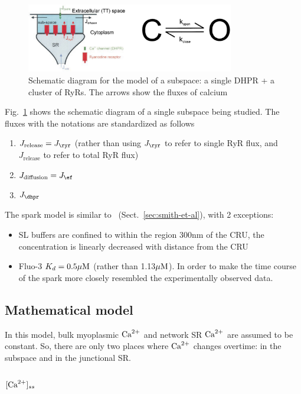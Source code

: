 \begin{figure}[hbt]
  \centerline{\includegraphics[height=3cm,
    angle=0]{./images/Sobie_Jafri-2002.eps}}
  \caption{Schematic diagram for the model of a subspace: a single DHPR
    + a cluster of RyRs. The arrows show the fluxes of calcium}
  \label{fig:Sobie_Jafri2002}
\end{figure}

Fig.~\ref{fig:Sobie_Jafri2002} shows the schematic diagram of a single
subspace being studied. The fluxes with the notations are standardized
as follows
\begin{enumerate}
\item $J_\text{release} = J_\ryr$ (rather than using $J_\ryr$ to refer
  to single RyR flux, and $J_\text{release}$ to refer to total RyR
  flux)
\item $J_\text{diffusion} = J_\ef$
\item $J_\dhpr$
\end{enumerate}

The spark model is similar to~\citep{smith1998}
(Sect.~\ref{sec:smith-et-al}), with 2 exceptions:
\begin{itemize}
\item SL buffers are confined to within the region 300nm of the CRU, the
concentration is linearly decreased with distance from the CRU
\item Fluo-3 $K_d=0.5{\mu\text{M}}$ (rather than 1.13${\mu\text{M}}$). In order to make the time
course of the spark more closely resembled the experimentally observed data.
\end{itemize}

\subsection{Mathematical model}
\label{sec:mathematical-model-13}

In this model, bulk myoplasmic ${\text{Ca}^{2+}}$ and network SR ${\text{Ca}^{2+}}$ are assumed
to be constant. So, there are only two places where ${\text{Ca}^{2+}}$ changes
overtime: in the subspace and in the junctional SR.

\subsubsection{$[{\text{Ca}^{2+}}]_{ss}$}
\label{sec:calcium_subspace}

